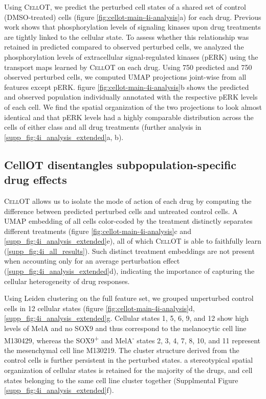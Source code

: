Using \textsc{CellOT}, 
we predict the perturbed cell states of a shared set of control (DMSO-treated) cells (figure \ref{fig:cellot-main-4i-analysis}a) for each drug.
Previous work \cite{kramer2022} shows that phosphorylation levels of signaling kinases upon drug treatments are tightly linked to the cellular state. 
To assess whether this relationship was retained in predicted compared to observed perturbed cells, we analyzed the phosphorylation levels of extracellular signal-regulated kinases (pERK) using the transport maps learned by \textsc{CellOT} on each drug.
Using 750 predicted and 750 observed perturbed cells, we computed UMAP projections joint-wise from all features except pERK.
figure \ref{fig:cellot-main-4i-analysis}b shows the predicted and observed population individually annotated with the respective pERK levels of each cell.
We find the spatial organization of the two projections to look almost identical and that pERK levels had a highly comparable distribution across the cells of either class and all drug treatments (further analysis in \ref{supp_fig:4i_analysis_extended}a, b).

\subsection{CellOT disentangles subpopulation-specific drug effects}
\textsc{CellOT} allows us to 
isolate the mode of action of each drug by computing the difference between predicted perturbed cells and untreated control cells. %
A UMAP embedding of all cells color-coded by the treatment distinctly separates different treatments (figure \ref{fig:cellot-main-4i-analysis}c and \ref{supp_fig:4i_analysis_extended}e), all of which \textsc{CellOT} is able to faithfully learn (\ref{supp_fig:4i_all_results}).
Such distinct treatment embeddings are not present when accounting only for an average perturbation effect (\ref{supp_fig:4i_analysis_extended}d), indicating the importance of capturing the cellular heterogeneity of drug responses.

Using Leiden clustering on the full feature set, we grouped unperturbed control cells in 12 cellular states (figure \ref{fig:cellot-main-4i-analysis}d, \ref{supp_fig:4i_analysis_extended}g.
Cellular states 1, 5, 6, 9, and 12 show high levels of MelA and no SOX9 and thus correspond to the melanocytic cell line M130429, whereas the SOX9\textsuperscript{+} and MelA\textsuperscript{-} states 2, 3, 4, 7, 8, 10, and 11 represent the mesenchymal cell line M130219.
The cluster structure derived from the control cells is further persistent in the perturbed states. 
a stereotypical spatial organization of cellular states is retained for the majority of the drugs,  and cell states belonging to the same cell line cluster together (Supplmental Figure \ref{supp_fig:4i_analysis_extended}f). 

